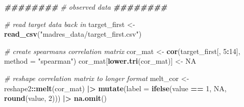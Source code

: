 \documentclass[12pt, twoside]{amherstthesis}
\newenvironment{Shaded}{\begin{snugshade}}{\end{snugshade}}
\newcommand{\AttributeTok}[1]{\textcolor[rgb]{0.13,0.29,0.53}{#1}}
\newcommand{\CommentTok}[1]{\textcolor[rgb]{0.56,0.35,0.01}{\textit{#1}}}
\newcommand{\ConstantTok}[1]{\textcolor[rgb]{0.56,0.35,0.01}{#1}}
\newcommand{\DecValTok}[1]{\textcolor[rgb]{0.00,0.00,0.81}{#1}}
\newcommand{\DocumentationTok}[1]{\textcolor[rgb]{0.56,0.35,0.01}{\textbf{\textit{#1}}}}
\newcommand{\FunctionTok}[1]{\textcolor[rgb]{0.13,0.29,0.53}{\textbf{#1}}}
\newcommand{\NormalTok}[1]{#1}
\newcommand{\OtherTok}[1]{\textcolor[rgb]{0.56,0.35,0.01}{#1}}
\newcommand{\SpecialCharTok}[1]{\textcolor[rgb]{0.81,0.36,0.00}{\textbf{#1}}}
\newcommand{\StringTok}[1]{\textcolor[rgb]{0.31,0.60,0.02}{#1}}
\begin{document}
\scriptsize
\begin{Shaded}
\begin{Highlighting}[]
\DocumentationTok{\#\#\#\#\#\#\#\#}
\CommentTok{\# observed data}
\DocumentationTok{\#\#\#\#\#\#\#\#}

\CommentTok{\# read target data back in}
\NormalTok{target\_first }\OtherTok{\textless{}{-}} \FunctionTok{read\_csv}\NormalTok{(}\StringTok{"madres\_data/target\_first.csv"}\NormalTok{)}

\CommentTok{\# create spearman\textquotesingle{}s correlation matrix}
\NormalTok{cor\_mat }\OtherTok{\textless{}{-}} \FunctionTok{cor}\NormalTok{(target\_first[, }\DecValTok{5}\SpecialCharTok{:}\DecValTok{14}\NormalTok{], }\AttributeTok{method =} \StringTok{"spearman"}\NormalTok{)}
\NormalTok{cor\_mat[}\FunctionTok{lower.tri}\NormalTok{(cor\_mat)] }\OtherTok{\textless{}{-}} \ConstantTok{NA}

\CommentTok{\# reshape correlation matrix to longer format}
\NormalTok{melt\_cor }\OtherTok{\textless{}{-}}\NormalTok{ reshape2}\SpecialCharTok{::}\FunctionTok{melt}\NormalTok{(cor\_mat) }\SpecialCharTok{|\textgreater{}} 
  \FunctionTok{mutate}\NormalTok{(}\AttributeTok{label =} \FunctionTok{ifelse}\NormalTok{(value }\SpecialCharTok{==} \DecValTok{1}\NormalTok{, }\ConstantTok{NA}\NormalTok{, }\FunctionTok{round}\NormalTok{(value, }\DecValTok{2}\NormalTok{))) }\SpecialCharTok{|\textgreater{}} 
  \FunctionTok{na.omit}\NormalTok{()}


\end{Highlighting}
\end{Shaded}
\end{document}
